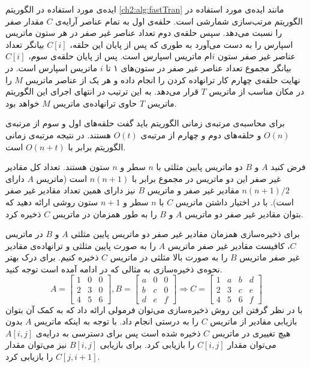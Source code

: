 ایده‌ی مورد استفاده در الگوریتم {\eqref{ch2:alg:fastTran}} مانند ایده‌ی مورد استفاده در الگوریتم مرتب‌سازی شمارشی است. حلقه‌ی اول به تمام عناصر آرایه‌ی {$C$} مقدار صفر را نسبت می‌دهد. سپس حلقه‌ی دوم تعداد عناصر غیر صفر در هر ستون ماتریس اسپارس را به دست می‌آورد به طوری که پس از پایان این حلقه، {$C[i]$} بیانگر تعداد عناصر غیر صفر ستون {$i$}ام ماتریس اسپارس است. پس از پایان حلقه‌ی سوم، {$C[i]$} بیانگر مجموع تعداد عناصر غیر صفر در ستون‌های ۱ تا {$i$} ماتریس اسپارس است. در نهایت حلقه‌ی چهارم کار ترانهاده کردن را انجام داده و هر یک از عناصر ماتریس {$M$} را در مکان مناسب از ماتریس {$T$} قرار می‌دهد. به این ترتیب در انتهای اجرای این الگوریتم ماتریس {$T$} حاوی ترانهاده‌ی ماتریس {$M$} خواهد بود.

برای محاسبه‌ی مرتبه‌ی زمانی الگوریتم {} باید گفت حلقه‌های اول و سوم از مرتبه‌ی {$O(n)$} و حلقه‌های دوم و چهارم از مرتبه‌ی {$O(t)$} هستند. در نتیجه مرتبه‌ی زمانی الگوریتم {} برابر با {$O(n+t)$} است.


 فرض کنید {$A$} و {$B$} دو ماتریس پایین مثلثی با {$n$} سطر و {$n$} ستون هستند. تعداد کل مقادیر غیر صفر این دو ماتریس در مجموع برابر با {$n(n+1)$} است (ماتریس {$A$} دارای {$n(n+1)/2$} مقادیر غیر صفر و ماتریس {$B$} نیز دارای همین تعداد مقادیر غیر صفر است). با در اختیار داشتن ماتریس {$C$} با {$n$} سطر و  {$n+1$} ستون روشی ارائه دهید که بتوان مقادیر غیر صفر دو ماتریس {$A$} و {$B$} را به طور همزمان در ماتریس {$C$} ذخیره کرد.


برای ذخیره‌سازی همزمان مقادیر غیر صفر دو ماتریس پایین مثلثی {$A$} و {$B$} در ماتریس {$C$}، کافیست مقادیر غیر صفر ماتریس {$A$} را به صورت پایین مثلثی و ترانهاده‌ی مقادیر غیر صفر ماتریس {$B$} را به صورت بالا مثلثی در ماتریس {$C$} ذخیره کنیم. برای درک بهتر نحوه‌ی ذخیره‌سازی به مثالی که در ادامه آمده است توجه کنید.
\begin{displaymath}
A=
\begin{bmatrix}
1 & 0 & 0 \\
2 & 3 & 0 \\
4 & 5 & 6
\end{bmatrix},
B=
\begin{bmatrix}
a & 0 & 0 \\
b & c & 0 \\
d & e & f
\end{bmatrix}
\Rightarrow C=
\begin{bmatrix}
1 & a & b & d \\
2 & 3 & c & e \\
4 & 5 & 6 & f
\end{bmatrix}
\end{displaymath}
با در نظر گرفتن این روش ذخیره‌سازی می‌توان فرمولی ارائه داد که به کمک آن بتوان بازیابی مقادیر از ماتریس {$C$} را به درستی انجام داد. با توجه به اینکه ماتریس {$A$} بدون هیچ تغییری در ماتریس {$C$} ذخیره شده است پس برای دسترسی به درایه‌ی {$A[i,j]$} می‌توان مقدار {$C[i,j]$} را بازیابی کرد. برای بازیابی {$B[i,j]$} نیز می‌توان مقدار {$C[j,i+1]$} را بازیابی کرد.

